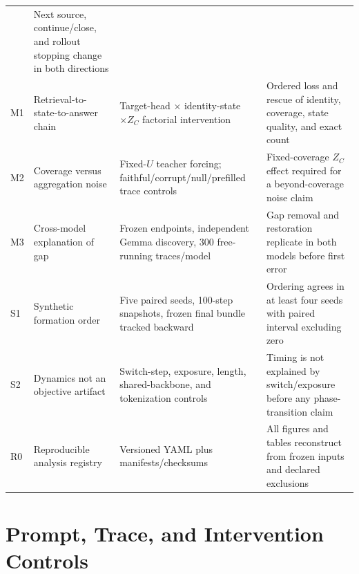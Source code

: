 \begin{table}[H]
\begin{tabularx}{\textwidth}{@{}P{.07\textwidth}P{.19\textwidth}P{.36\textwidth}Y@{}}
  & Next source, continue/close, and rollout stopping change in both directions \\
M1 & Retrieval-to-state-to-answer chain
  & Target-head \(\times\) identity-state \(\times Z_C\) factorial intervention
  & Ordered loss and rescue of identity, coverage, state quality, and exact count \\
M2 & Coverage versus aggregation noise
  & Fixed-\(U\) teacher forcing; faithful/corrupt/null/prefilled trace controls
  & Fixed-coverage \(Z_C\) effect required for a beyond-coverage noise claim \\
M3 & Cross-model explanation of gap
  & Frozen endpoints, independent Gemma discovery, 300 free-running traces/model
  & Gap removal and restoration replicate in both models before first error \\
S1 & Synthetic formation order
  & Five paired seeds, 100-step snapshots, frozen final bundle tracked backward
  & Ordering agrees in at least four seeds with paired interval excluding zero \\
S2 & Dynamics not an objective artifact
  & Switch-step, exposure, length, shared-backbone, and tokenization controls
  & Timing is not explained by switch/exposure before any phase-transition claim \\
R0 & Reproducible analysis registry
  & Versioned YAML plus manifests/checksums
  & All figures and tables reconstruct from frozen inputs and declared exclusions \\
\bottomrule
\end{tabularx}
\end{table}

\section{Prompt, Trace, and Intervention Controls}
\label{app:controls}

